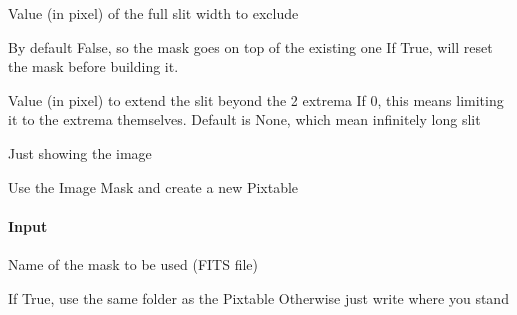 \documentclass[letterpaper,10pt,english]{sphinxmanual}
\begin{document}
\begin{fulllineitems}
\begin{fulllineitems}
\begin{description}
\sphinxAtStartPar
Value (in pixel) of the full slit width to exclude

\sphinxAtStartPar
By default False, so the mask goes on top of the existing one
If True, will reset the mask before building it.

\sphinxAtStartPar
Value (in pixel) to extend the slit beyond the 2 extrema
If 0, this means limiting it to the extrema themselves.
Default is None, which mean infinitely long slit

\end{description}

\end{fulllineitems}


\begin{fulllineitems}
\label{\detokenize{api/pymusepipe:pymusepipe.mpdaf_pipe.PixTableToMask.imshow}}
\pysigstartsignatures
{}
\pysigstopsignatures
\sphinxAtStartPar
Just showing the image

\end{fulllineitems}


\begin{fulllineitems}
\label{\detokenize{api/pymusepipe:pymusepipe.mpdaf_pipe.PixTableToMask.mask_pixtable}}
\pysigstartsignatures
{}
\pysigstopsignatures
\sphinxAtStartPar
Use the Image Mask and create a new Pixtable


\paragraph{Input}
\label{\detokenize{api/pymusepipe:id99}}\begin{description}
\sphinxAtStartPar
Name of the mask to be used (FITS file)

\sphinxAtStartPar
If True, use the same folder as the Pixtable
Otherwise just write where you stand


\end{description}
\end{fulllineitems}
\end{fulllineitems}
\end{document}
